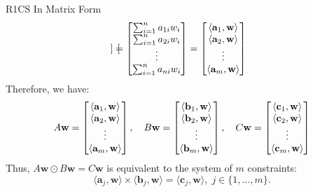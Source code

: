 \documentclass{beamer}
\begin{document}
\begin{frame}{R1CS In Matrix Form}
{\begin{equation*}
\begin{bmatrix}
            \end{bmatrix} = \begin{bmatrix}
                \sum_{i=1}^{n}a_{1i}w_i \\ \sum_{i=1}^{n}a_{2i}w_i \\ \vdots \\ \sum_{i=1}^{n}a_{ni}w_i
            \end{bmatrix} = \begin{bmatrix}
                \langle \mathbf{a}_1, \mathbf{w}\rangle \\
                \langle \mathbf{a}_2, \mathbf{w}\rangle \\
                \vdots \\
                \langle \mathbf{a}_m, \mathbf{w}\rangle 
            \end{bmatrix}
            \vspace{-5pt}
        \end{equation*}}
        \pause
        Therefore, we have:
        \vspace{-5pt}
        {\scriptsize \begin{equation*}
            A\mathbf{w} = \begin{bmatrix}
                \langle \mathbf{a}_1, \mathbf{w}\rangle \\
                \langle \mathbf{a}_2, \mathbf{w}\rangle \\
                \vdots \\
                \langle \mathbf{a}_m, \mathbf{w}\rangle 
            \end{bmatrix}, \quad
            B\mathbf{w} = \begin{bmatrix}
                \langle \mathbf{b}_1, \mathbf{w}\rangle \\
                \langle \mathbf{b}_2, \mathbf{w}\rangle \\
                \vdots \\
                \langle \mathbf{b}_m, \mathbf{w}\rangle 
            \end{bmatrix}, \quad
            C\mathbf{w} = \begin{bmatrix}
                \langle \mathbf{c}_1, \mathbf{w}\rangle \\
                \langle \mathbf{c}_2, \mathbf{w}\rangle \\
                \vdots \\
                \langle \mathbf{c}_m, \mathbf{w}\rangle 
            \end{bmatrix}
            \vspace{-5pt}
        \end{equation*}}
        \pause
        Thus, {\small $A\mathbf{w} \odot B\mathbf{w} = C\mathbf{w}$} is equivalent to the system of $m$ constraints:
        \vspace{-5pt}
        {\small \begin{equation*}
            \langle \mathbf{a}_j, \mathbf{w}\rangle \times \langle \mathbf{b}_j, \mathbf{w} \rangle = \langle \mathbf{c}_j, \mathbf{w} \rangle, \; j \in \{1,\dots,m\}.
        \end{equation*}}
    \end{frame}
\end{document}
